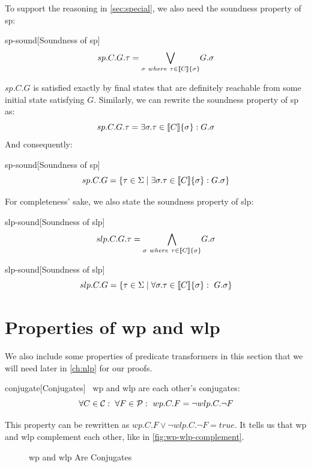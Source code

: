 To support the reasoning in \autoref{sec:special}, we also need the soundness property of sp: 
\begin{theorem}{sp-sound}[Soundness of sp]~{\normalfont\cite{vries11,zhang22}}
\ \vspace{-1.5mm}
\[
sp.C.G.\tau = \underset{\sigma\ where\ \tau\in\llbracket C \rrbracket\{\sigma\}}{\bigvee} G.\sigma
\]
\end{theorem}

$sp.C.G$ is satisfied exactly by final states that are definitely reachable from some initial state satisfying $G$. 
Similarly, we can rewrite the soundness property of sp as: 
\[sp.C.G.\tau = \exists \sigma.\tau\in\llbracket C \rrbracket\{\sigma\}: G.\sigma\]
And consequently: 
\begin{corollary}{sp-sound}[Soundness of sp]
  \[sp.C.G = \{\tau\in{\Sigma}\mid \exists\sigma.\tau\in\llbracket C \rrbracket\{\sigma\}: G.\sigma\}\]
\end{corollary}

For completeness' sake, we also state the soundness property of slp: 
\begin{theorem}{slp-sound}[Soundness of slp]~{\normalfont\cite{zhang22}}
  \ \vspace{-1.5mm}
  \[
  slp.C.G.\tau = \underset{\sigma\ where\ \tau\in\llbracket C \rrbracket\{\sigma\}}{\bigwedge} G.\sigma
  \]
\end{theorem}
\begin{corollary}{slp-sound}[Soundness of slp]
  \[slp.C.G = \{\tau\in{\Sigma}\mid \forall\sigma.\tau\in\llbracket C \rrbracket\{\sigma\}:\ G.\sigma\}\]
\end{corollary}

\section{Properties of wp and wlp}\label{sec:prop}
We also include some properties of predicate transformers in this section that we will need later in \autoref{ch:nlp} for our proofs. 
\begin{theorem}{conjugate}[Conjugates]~{\normalfont\cite{zhang22}}
  wp and wlp are each other's conjugates:
  \[\forall C\in\mathcal{C}:\ \forall F\in\mathcal{P}:\ wp.C.F = \neg wlp.C.\neg F\]
\end{theorem}
This property can be rewritten as $wp.C.F\vee \neg wlp.C.\neg F = true$.
It tells us that wp and wlp complement each other, like in \autoref{fig:wp-wlp-complement}. 

\begin{figure}[ht]\centering
  
  \caption{wp and wlp Are Conjugates}
  \label{fig:wp-wlp-complement}
\end{figure}


